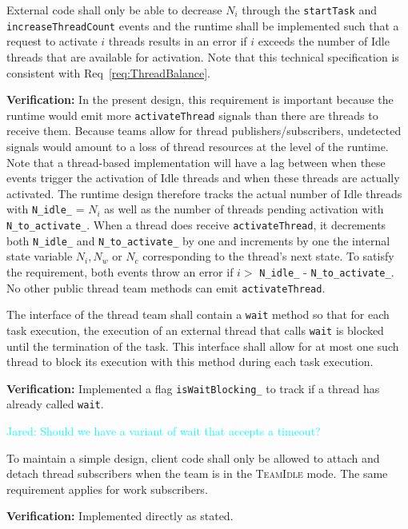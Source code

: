 \documentclass{article}
\newcommand{\TeamIdle}          {\textsc{TeamIdle}}
\newcommand{\Jared}[1]          {\textcolor{cyan}{Jared: #1}}
\begin{document}
\begin{spec}
External code shall only be able to decrease $N_i$ through the
\texttt{startTask} and \texttt{increaseThreadCount} events and the runtime shall
be implemented such that a request to activate $i$ threads results in an error
if $i$ exceeds the number of Idle threads that are available for activation.
Note that this technical specification is consistent with
Req~\ref{req:ThreadBalance}.
\end{spec}
\textbf{Verification:}\hspace{0.125in}  In the present design, this requirement
is important because the runtime would emit more \texttt{activateThread} signals
than there are threads to receive them.  Because teams allow for thread
publishers/subscribers, undetected signals would amount to a loss of thread
resources at the level of the runtime.  Note that a thread-based implementation
will have a lag between when these events trigger the activation of Idle threads
and when these threads are actually activated.  The runtime design therefore
tracks the actual number of Idle threads with \texttt{N\_idle\_} = $N_i$ as well
as the number of threads pending activation with \texttt{N\_to\_activate\_}.
When a thread does receive \texttt{activateThread}, it decrements both
\texttt{N\_idle\_} and \texttt{N\_to\_activate\_} by one and increments by one
the internal state variable $N_i, N_w$ or $N_c$ corresponding to the thread's
next state.  To satisfy the requirement, both events throw an error if $i > $
\texttt{N\_idle\_} - \texttt{N\_to\_activate\_}.  No other public thread team
methods can emit \texttt{activateThread}.

\begin{spec}
\label{spec:Runtime_OneWait}
The interface of the thread team shall contain a \texttt{wait} method so that
for each task execution, the execution of an external thread that calls
\texttt{wait} is blocked until the termination of the task.  This interface
shall allow for at most one such thread to block its execution with this method
during each task execution.
\end{spec}
\textbf{Verification:}\hspace{0.125in}  Implemented a flag
\texttt{isWaitBlocking\_} to track if a thread has already called \texttt{wait}.

\Jared{Should we have a variant of wait that accepts a timeout?}

\begin{spec}
To maintain a simple design, client code shall only be allowed to attach and
detach thread subscribers when the team is in the {\TeamIdle} mode.  The same
requirement applies for work subscribers.
\end{spec}
\textbf{Verification:}\hspace{0.125in} Implemented directly as stated.
\end{document}
